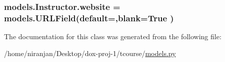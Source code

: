 \subsubsection[{\texorpdfstring{website}{website}}]{\setlength{\rightskip}{0pt plus 5cm}models.\+Instructor.\+website = models.\+U\+R\+L\+Field(default=\textquotesingle{}\textquotesingle{},blank=True )\hspace{0.3cm}{\ttfamily [static]}}\hypertarget{classmodels_1_1_instructor_abd5281a880321e409a4e0a490c87d4c2}{}\label{classmodels_1_1_instructor_abd5281a880321e409a4e0a490c87d4c2}


The documentation for this class was generated from the following file\+:\begin{DoxyCompactItemize}
\item 
/home/niranjan/\+Desktop/dox-\/proj-\/1/tcourse/\hyperlink{models_8py}{models.\+py}\end{DoxyCompactItemize}
